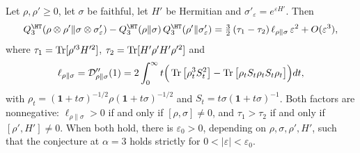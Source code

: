 \begin{proposition}\label{shB:prop:local3}
Let $\rho,\rho'\ge0$, let $\sigma$ be faithful, let $H'$ be Hermitian and $\sigma'_\varepsilon=e^{\varepsilon H'}$. Then
\[
Q^\HT_3(\rho\otimes\rho'\|\sigma\otimes\sigma'_\varepsilon)-Q^\HT_3(\rho\|\sigma)\,Q^\HT_3(\rho'\|\sigma'_\varepsilon)=\tfrac32\,(\tau_1-\tau_2)\,\ell_{\rho\|\sigma}\,\varepsilon^2+O(\varepsilon^3),
\]
where $\tau_1=\operatorname{Tr}[\rho'^3H'^2]$, $\tau_2=\operatorname{Tr}[H'\rho'H'\rho'^2]$ and
\[
\ell_{\rho\|\sigma}=\mathcal D''_{\rho\|\sigma}(1)=2\int_0^\infty t\Big(\operatorname{Tr}\big[\rho_t^3S_t^2\big]-\operatorname{Tr}\big[\rho_tS_t\rho_tS_t\rho_t\big]\Big)dt,
\]
with $\rho_t=(\mathbf 1+t\sigma)^{-1/2}\rho(\mathbf 1+t\sigma)^{-1/2}$ and $S_t=t\sigma(\mathbf 1+t\sigma)^{-1}$. Both factors are nonnegative: $\ell_{\rho\|\sigma}>0$ if and only if $[\rho,\sigma]\ne0$, and $\tau_1>\tau_2$ if and only if $[\rho',H']\ne0$. When both hold, there is $\varepsilon_0>0$, depending on $\rho,\sigma,\rho',H'$, such that the conjecture at $\alpha=3$ holds strictly for $0<|\varepsilon|<\varepsilon_0$.
\end{proposition}

